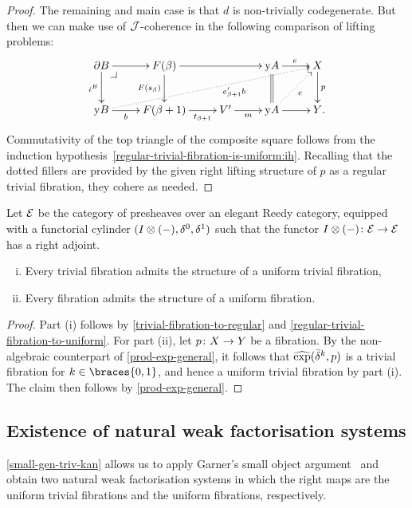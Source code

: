 \documentclass[reqno,10pt,a4paper,oneside,draft]{amsart}
\begin{document}
\begin{proof}
The remaining and main case is that $d$ is non-trivially codegenerate.
But then we can make use of $\cal{J}$-coherence in the following comparison of lifting problems:
\[
\xymatrix{
  \partial B
  \ar[r]
  \ar[d]_{i^B}
  \pullback{dr}
&
  F(\beta)
  \ar[rr]
  \ar[d]_{F(s_{\beta})}
&&
  \yon A
  \ar[r]^{e}
  \ar@{=}[d]
&
  X
  \ar[d]^{p}
\\
  \yon B
  \ar[r]_-{b}
  \ar@{.>}[urrrr]_(0.6){e_{\beta+1}' b}
&
  F(\beta+1)
  \ar[r]_-{t_{\beta+1}}
&
  V'
  \ar[r]_-{m}
&
  \yon A
  \ar[r]
  \ar@{.>}[ur]_{e}
&
  Y
\rlap{.}}
\]
Commutativity of the top triangle of the composite square follows from the induction hypothesis~\eqref{regular-trivial-fibration-is-uniform:ih}.
Recalling that the dotted fillers are provided by the given right lifting structure of $p$ as a regular trivial fibration, they cohere as needed.
\end{proof}

\begin{theorem} \label{thm:ac-kan-is-uniform} Let $\catE$ be the category of presheaves over an elegant Reedy category, equipped with a functorial cylinder $(\interval \otimes (-), \lcyl, \rcyl)$ such that the functor $\interval \otimes (-) \co \catE \to \catE$ has a right adjoint.
\begin{enumerate}[(i)]
\item Every trivial fibration admits the structure of a uniform trivial fibration,
\item Every fibration admits the structure of a uniform fibration.
\end{enumerate}
\end{theorem}

\begin{proof}
Part (i) follows by \cref{trivial-fibration-to-regular} and \cref{regular-trivial-fibration-to-uniform}.
For part (ii), let $p \co X \to Y$ be a fibration.
By the non-algebraic counterpart of \cref{prod-exp-general}, it follows that $\hatexp(\bar{\delta}^k, p)$
is a trivial fibration for $k \in \braces{0, 1}$, and hence a uniform trivial fibration by part (i).
The claim then follows by \cref{prod-exp-general}.
\end{proof}

\subsection*{Existence of natural weak factorisation systems}

\cref{small-gen-triv-kan} allows us to apply Garner's small object argument~\cite{garner:small-object-argument} and obtain two natural weak factorisation systems in which the right maps are the uniform trivial fibrations and the uniform fibrations, respectively.
\end{document}
